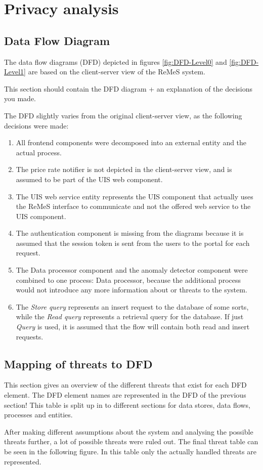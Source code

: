 \section{Privacy analysis}
\subsection{Data Flow Diagram}

The data flow diagrams (DFD) depicted in figures \ref{fig:DFD-Level0} and \ref{fig:DFD-Level1} are based on the client-server view of the ReMeS system.

This section should contain the DFD diagram + an explanation of the decisions you made.

The DFD slightly varies from the original client-server view, as the following decisions were made: 
\begin{enumerate}
	\item All frontend components were decomposed into an external entity and the actual process. 
	\item The price rate notifier is not depicted in the client-server view, and is assumed to be part of the UIS web component.
	\item The UIS web service entity represents the UIS component that actually uses the ReMeS interface to communicate and not the offered web service to the UIS component.
	\item The authentication component is missing from the diagrams because it is assumed that the session token is sent from the users to the portal for each request.
	\item The Data processor component and the anomaly detector component were combined to one process: Data processor, 
because the additional process would not introduce any more information about or threats to the system.
	\item The \textit{Store query} represents an insert request to the database of some sorts, while the \textit{Read query}
represents a retrieval query for the database. 
If just \textit{Query} is used, it is assumed that the flow will contain both read and insert requests.
\end{enumerate}

\subsection{Mapping of threats to DFD}

This section gives an overview of the different threats that exist for each DFD element.
The DFD element names are represented in the DFD of the previous section!
This table is split up in to different sections for data stores, data flows, processes and entities.




\newpage
After making different assumptions about the system and analysing the possible threats further, a lot of possible threats were ruled out.
The final threat table can be seen in the following figure. In this table only the actually handled threats are represented.

